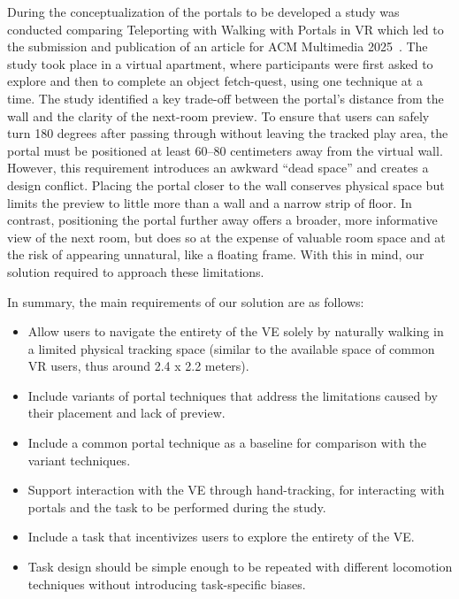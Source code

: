 During the conceptualization of the portals to be developed a study was conducted comparing Teleporting with Walking with Portals in 
\gls{VR} which led to the submission and publication of an article for ACM Multimedia 2025~\cite{}.
The study took place in a virtual apartment, where participants were first asked to explore and then to complete an object fetch-quest, 
using one technique at a time. The study identified a key trade-off between the portal's distance from the wall and the clarity of the 
next-room preview. To ensure that users can safely turn 180 degrees after passing through without leaving the tracked play area, the portal 
must be positioned at least 60–80 centimeters away from the virtual wall. However, this requirement introduces an awkward “dead space” and 
creates a design conflict. Placing the portal closer to the wall conserves physical space but limits the preview to little more than 
a wall and a narrow strip of floor. In contrast, positioning the portal further away offers a broader, more informative view of the next room, 
but does so at the expense of valuable room space and at the risk of appearing unnatural, like a floating frame. With this in mind, our solution 
required to approach these limitations.

In summary, the main requirements of our solution are as follows:

\begin{itemize}
  \item Allow users to navigate the entirety of the \gls{VE} solely by naturally walking in a limited physical tracking space (similar to 
  the available space of common \gls{VR} users, thus around 2.4 x 2.2 meters\cite{Azmandian2015, Liu2018b}).
  
  \item Include variants of portal techniques that address the limitations caused by their placement and lack of preview.
  
  \item Include a common portal technique as a baseline for comparison with the variant techniques.

  \item Support interaction with the \gls{VE} through hand-tracking, for interacting with portals and the task to be performed during the study.
 
  \item Include a task that incentivizes users to explore the entirety of the \gls{VE}.
  
  \item Task design should be simple enough to be repeated with different locomotion techniques without introducing task-specific biases. 
  
\end{itemize}

